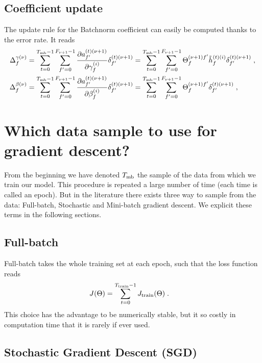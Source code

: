 \subsection{Coefficient update}

The update rule for the Batchnorm coefficient can easily be computed thanks to the error rate. It reads
\begin{align}
\Delta_f^{\gamma(\nu)}&=\sum_{t=0}^{T_{{\rm mb}}-1}\sum_{f'=0}^{F_{\nu+1}-1}
%
\frac{\partial a^{(t)(\nu+1)}_{f'}}{\partial\gamma_f^{(i)}}\delta^{(t)(\nu+1)}_{f'}
%
=\sum_{t=0}^{T_{{\rm mb}}-1}\sum_{f'=0}^{F_{\nu+1}-1}
%
\Theta^{(\nu+1)f'}_{f}\tilde{h}^{(t)(i)}_{f}\delta^{(t)(\nu+1)}_{f'}\;,\\
%
\Delta_f^{\beta(\nu)}&=\sum_{t=0}^{T_{{\rm mb}}-1}\sum_{f'=0}^{F_{\nu+1}-1}
%
\frac{\partial a^{(t)(\nu+1)}_{f'}}{\partial\beta_f^{(i)}}\delta^{(t)(\nu+1)}_{f'}
%
=\sum_{t=0}^{T_{{\rm mb}}-1}\sum_{f'=0}^{F_{\nu+1}-1}\Theta^{(\nu+1)f'}_{f}\delta^{(t)(\nu+1)}_{f'}\;,
\end{align}


\section{Which data sample to use for gradient descent?}

From the beginning we have denoted $T_{{\rm mb}}$ the sample of the data from which we train our model. This procedure is repeated a large number of time (each time is called an epoch). But in the literature there exists three way to sample from the data: Full-batch, Stochastic and Mini-batch gradient descent. We explicit these terms in the following sections.

\subsection{Full-batch}

Full-batch takes the whole training set at each epoch, such that the loss function reads
\begin{align}
J(\Theta)&=\sum_{t=0}^{T_{{\rm train}}-1}J_{{\rm train}}(\Theta)\;.
\end{align}
This choice has the advantage to be numerically stable, but it so costly in computation time that it is rarely if ever used.

\subsection{Stochastic Gradient Descent (SGD)}

